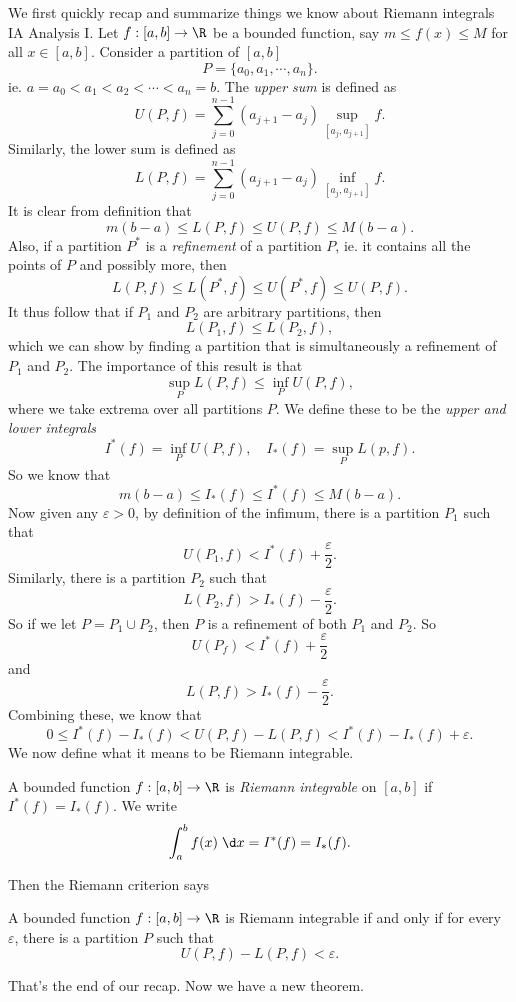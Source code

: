 \documentclass[a4paper]{article}
\begin{document}
We first quickly recap and summarize things we know about Riemann integrals IA Analysis I. Let $f: [a, b] \to \R$ be a bounded function, say $m \leq f(x) \leq M$ for all $x\in [a, b]$. Consider a partition of $[a, b]$
\[
  P = \{a_0, a_1, \cdots, a_n\}.
\]
ie. $a = a_0 < a_1 < a_2 < \cdots < a_n = b$. The \emph{upper sum} is defined as
\[
  U(P, f) = \sum_{j = 0}^{n - 1} (a_{j + 1} - a_j) \sup_{[a_j, a_{j + 1}]} f.
\]
Similarly, the lower sum is defined as
\[
  L(P, f) = \sum_{j = 0}^{n - 1} (a_{j + 1} - a_j) \inf_{[a_j, a_{j + 1}]} f.
\]
It is clear from definition that
\[
  m(b - a) \leq L(P, f) \leq U(P, f) \leq M(b - a).
\]
Also, if a partition $P^*$ is a \emph{refinement} of a partition $P$, ie. it contains all the points of $P$ and possibly more, then
\[
  L(P, f) \leq L(P^*, f) \leq U(P^*, f) \leq U(P, f).
\]
It thus follow that if $P_1$ and $P_2$ are arbitrary partitions, then
\[
  L(P_1, f) \leq L(P_2, f),
\]
which we can show by finding a partition that is simultaneously a refinement of $P_1$ and $P_2$. The importance of this result is that
\[
  \sup_{P} L(P, f) \leq \inf_P U(P, f),
\]
where we take extrema over all partitions $P$. We define these to be the \emph{upper and lower integrals}
\[
  I^*(f) = \inf_P U(P, f),\quad I_*(f) = \sup_P L(p, f).
\]
So we know that
\[
  m(b - a) \leq I_*(f) \leq I^*(f) \leq M(b - a).
\]
Now given any $\varepsilon > 0$, by definition of the infimum, there is a partition $P_1$ such that
\[
  U(P_1, f) < I^*(f) + \frac{\varepsilon}{2}.
\]
Similarly, there is a partition $P_2$ such that
\[
  L(P_2, f) > I_*(f) - \frac{\varepsilon}{2}.
\]
So if we let $P = P_1 \cup P_2$, then $P$ is a refinement of both $P_1$ and $P_2$. So
\[
  U(P_f) < I^*(f) + \frac{\varepsilon}{2}
\]
and
\[
  L(P, f) > I_*(f) - \frac{\varepsilon}{2}.
\]
Combining these, we know that
\[
  0 \leq I^*(f) - I_*(f) < U(P, f) - L(P, f) < I^*(f) - I_*(f) + \varepsilon.
\]
We now define what it means to be Riemann integrable.
\begin{defi}
  A bounded function $f: [a, b] \to \R$ is \emph{Riemann integrable} on $[a, b]$ if $I^*(f) = I_*(f)$. We write
  \[
    \int_a^b f(x)\;\d x = I^*(f) = I_*(f).
  \]
\end{defi}

Then the Riemann criterion says
\begin{thm}
  A bounded function $f: [a, b] \to \R$ is Riemann integrable if and only if for every $\varepsilon$, there is a partition $P$ such that
  \[
    U(P, f) - L(P, f) < \varepsilon.
  \]
\end{thm}
That's the end of our recap. Now we have a new theorem.
\end{document}
